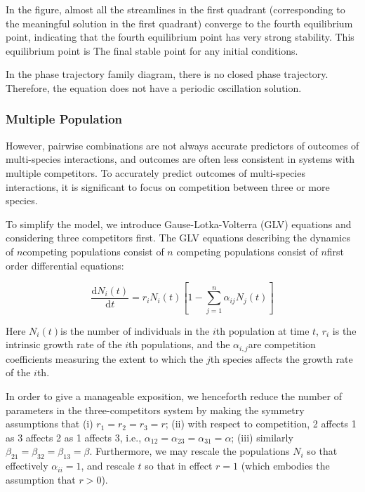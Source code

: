 \documentclass{mcmthesis}
\begin{document}
In the figure, almost all the streamlines in the first quadrant (corresponding to the meaningful solution in the first quadrant) converge to the fourth equilibrium point, indicating that the fourth equilibrium point has very strong stability. This equilibrium point is The final stable point for any initial conditions.

In the phase trajectory family diagram, there is no closed phase trajectory. Therefore, the equation does not have a periodic oscillation solution.

\subsubsection{Multiple Population}

However, pairwise combinations are not always accurate predictors of outcomes of multi-species interactions, and outcomes are often less consistent in systems with multiple competitors. To accurately predict outcomes of multi-species interactions, it is significant to focus on competition between three or more species.

To simplify the model, we  introduce Gause-Lotka-Volterra (GLV) equations and considering three competitors first. The GLV equations describing the dynamics of $ n $competing populations consist of $ n $ competing populations consist of $ n $first order differential equations:

\begin{equation}
  \frac{\mathrm{d} N_{i}(t)}{\mathrm{d} t}=r_{i} N_{i}(t)\left[1-\sum_{j=1}^{n} \alpha_{i j} N_{j}(t)\right]
\end{equation}

Here $ N_{i}(t) $is the number of individuals in the $ i $th population at time $ t $, $ r_i $ is the intrinsic growth rate of the $ i $th populations, and the $ \alpha_{i,j} $are competition coefficients measuring the extent to which the $ j $th species affects the growth rate of the $ i $th.

In order to give a manageable exposition, we henceforth reduce the number of parameters in the three-competitors system by making the symmetry assumptions that (i) $ r_1=r_2=r_3=r $; (ii) with respect to competition, 2 affects 1 as 3 affects 2 as 1 affects 3, i.e., $ \alpha_{12}=\alpha_{23}=\alpha_{31}=\alpha $; (iii) similarly $ \beta_{21}=\beta_{32}=\beta_{13}=\beta $. Furthermore, we may rescale the populations $ N_i $ so that effectively $ \alpha_{ii}=1 $, and rescale $ t $ so that in effect $ r=1 $ (which embodies the assumption that $ r>0 $).
\end{document}
